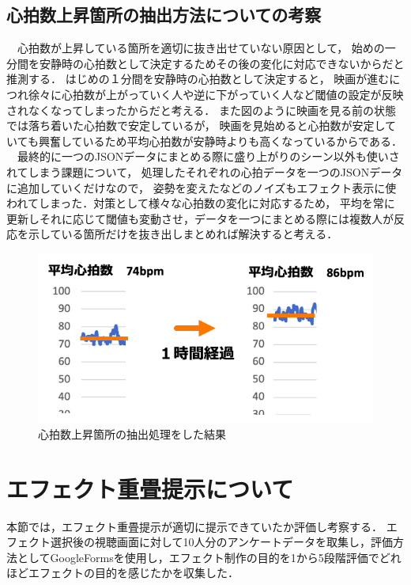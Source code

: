 \subsection{心拍数上昇箇所の抽出方法についての考察}
　心拍数が上昇している箇所を適切に抜き出せていない原因として，
始めの一分間を安静時の心拍数として決定するためその後の変化に対応できないからだと推測する．
はじめの１分間を安静時の心拍数として決定すると，
映画が進むにつれ徐々に心拍数が上がっていく人や逆に下がっていく人など閾値の設定が反映されなくなってしまったからだと考える．
また図のように映画を見る前の状態では落ち着いた心拍数で安定しているが，
映画を見始めると心拍数が安定していても興奮しているため平均心拍数が安静時よりも高くなっているからである．
　最終的に一つのJSONデータにまとめる際に盛り上がりのシーン以外も使いされてしまう課題について，
処理したそれぞれの心拍データを一つのJSONデータに追加していくだけなので，
姿勢を変えたなどのノイズもエフェクト表示に使われてしまった．対策として様々な心拍数の変化に対応するため，
平均を常に更新しそれに応じて閾値も変動させ，データを一つにまとめる際には複数人が反応を示している箇所だけを抜き出しまとめれば解決すると考える． 

\begin{figure}[H]
    \centering
    \includegraphics[width=13cm]{images/chapter4/bpmave.png}
    \caption{心拍数上昇箇所の抽出処理をした結果}
\end{figure}

\section{エフェクト重畳提示について}
本節では，エフェクト重畳提示が適切に提示できていたか評価し考察する．
エフェクト選択後の視聴画面に対して10人分のアンケートデータを取集し，評価方法としてGoogleFormsを使用し，エフェクト制作の目的を1から5段階評価でどれほどエフェクトの目的を感じたかを収集した．

